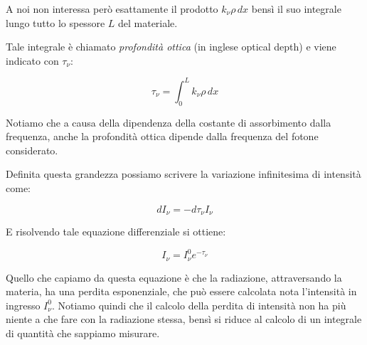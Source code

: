 A noi non interessa però esattamente il prodotto $ k_{\nu} \rho \, dx $ bensì il suo integrale lungo tutto lo spessore $L$ del materiale.

\begin{figure}[H]
   \centering
\end{figure}

Tale integrale è chiamato \textit{profondità ottica} (in inglese optical depth) e viene indicato con $\tau_{\nu}$:

\begin{equation}
   \tau_{\nu} = \int_0^L k_{\nu} \rho \, dx
\end{equation}

Notiamo che a causa della dipendenza della costante di assorbimento dalla frequenza, anche la profondità ottica dipende dalla frequenza del fotone considerato.

Definita questa grandezza possiamo scrivere la variazione infinitesima di intensità come:

\begin{equation}
   dI_{\nu}=- d\tau_{\nu} I_{\nu}
\end{equation}

E risolvendo tale equazione differenziale si ottiene:

\begin{equation}
   I_{\nu}=I^{0}_{\nu} e^{- \tau_{\nu}}
\end{equation}

Quello che capiamo da questa equazione è che la radiazione, attraversando la materia, ha una perdita esponenziale, che può essere calcolata nota l'intensità in ingresso $I^{0}_{\nu}$. Notiamo quindi che il calcolo della perdita di intensità non ha più niente a che fare con la radiazione stessa, bensì si riduce al calcolo di un integrale di quantità che sappiamo misurare.


